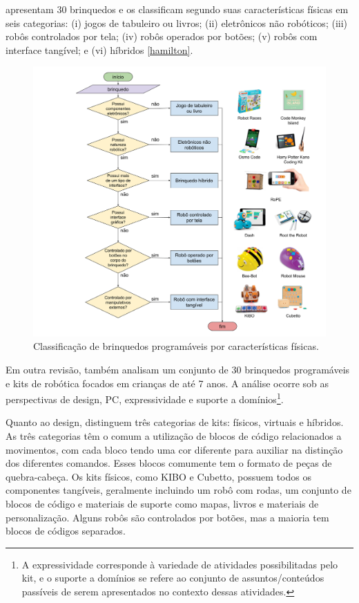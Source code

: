  apresentam 30 brinquedos e os classificam segundo suas características físicas em seis categorias: (i) jogos de tabuleiro ou livros; (ii) eletrônicos não robóticos; (iii) robôs controlados por tela; (iv) robôs operados por botões; (v) robôs com interface tangível; e (vi) híbridos \autoref{hamilton}. 

\begin{figure}[!htpb]
  \centering
  \includegraphics[width=.9\linewidth,fbox]{figs/hamilton_classification.png}
  \caption{Classificação de brinquedos programáveis por características físicas.}
  \label{hamilton}
\end{figure}

Em outra revisão,  também analisam um conjunto de 30 brinquedos programáveis e kits de robótica focados em crianças de até 7 anos. A análise ocorre sob as perspectivas de design, \acl{PC}, expressividade e suporte a domínios\footnote{
A expressividade corresponde à variedade de atividades possibilitadas pelo kit, e o suporte a domínios se refere ao conjunto de assuntos/conteúdos passíveis de serem apresentados no contexto dessas atividades.
}.

Quanto ao design,  distinguem três categorias de kits: físicos, virtuais e híbridos. As três categorias têm o comum a utilização de blocos de código relacionados a movimentos, com cada bloco tendo uma cor diferente para auxiliar na distinção dos diferentes
comandos. Esses blocos comumente tem o formato de peças de quebra-cabeça. Os kits físicos, como KIBO e Cubetto, possuem todos os componentes tangíveis, geralmente incluindo um robô com rodas, um conjunto de blocos de código e materiais de suporte como mapas, livros e materiais de personalização. Alguns robôs são controlados por botões, mas a maioria tem blocos de códigos separados.


